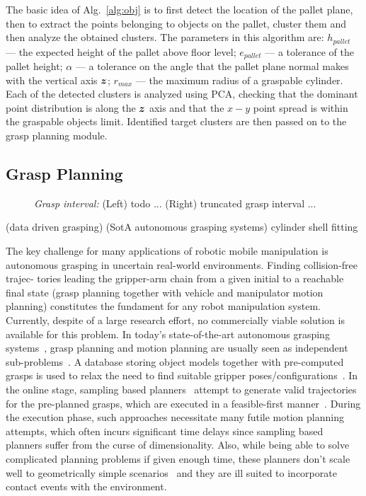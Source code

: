 %
\par
The basic idea of Alg.~\ref{alg:obj} is to first detect the location of the pallet plane, then to extract the points belonging to objects on the pallet, cluster them and then analyze the obtained clusters. The parameters in this algorithm are: $h_{pallet}$ --- the expected height of the pallet above floor level; $e_{pallet}$ --- a tolerance of the pallet height; $\alpha$ --- a tolerance on the angle that the pallet plane normal makes with the vertical axis $\mbox{\boldmath $z$}$; $r_{max}$ --- the maximum radius of a graspable cylinder. Each of the detected clusters is analyzed using PCA, checking that the dominant point distribution is along the $\mbox{\boldmath $z$}$ axis and that the $x-y$ point spread is within the graspable objects limit. Identified target clusters are then passed on to the grasp planning module.
%
\subsection{Grasp Planning}
\begin{figure}[t!] 
   \centering
     
   \caption{\textit{Grasp interval:} (Left) todo ... (Right) truncated grasp interval ...} 
   \label{fig:grasp_interval}
\end{figure}
%
\cite{Bohg14}(data driven grasping) (SotA autonomous grasping systems) \cite{Pas13} cylinder shell
fitting

The key challenge for many applications of robotic mobile manipulation is autonomous grasping in
uncertain real-world environments. Finding collision-free trajec- tories leading the gripper-arm
chain from a given initial to a reachable final state (grasp planning together with vehicle and
manipulator motion planning) constitutes the fundament for any robot manipulation system. Currently,
despite of a large research effort, no commercially viable solution is available for this
problem. In today’s state-of-the-art autonomous grasping systems~\cite{Bere07, Srin10, Krug14a},
grasp planning and motion planning are usually seen as independent sub-problems~\cite{Dian10}. A
database storing object models together with pre-computed grasps is used to relax the need to find
suitable gripper poses/configurations~\cite{Mill04, Gold11, Krug14a}. In the online stage, sampling
based planners~\cite{LaVa06} attempt to generate valid trajectories for the pre-planned grasps,
which are executed in a feasible-first manner~\cite{Bere07}. During the execution phase, such
approaches necessitate many futile motion planning attempts, which often incurs significant time
delays since sampling based planners suffer from the curse of dimensionality. Also, while being able
to solve complicated planning problems if given enough time, these planners don’t scale well to
geometrically simple scenarios~\cite{Ratl09} and they are ill suited to incorporate contact events
with the environment.

